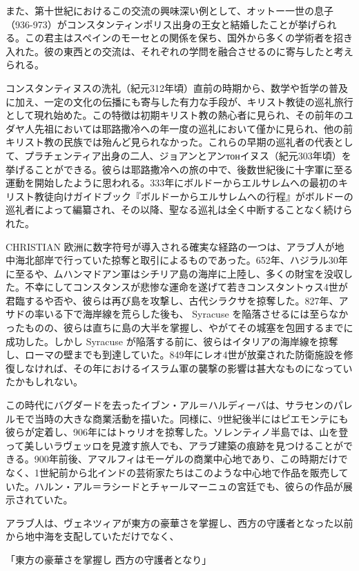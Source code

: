 \documentclass[a4paper,11pt,openany]{ltjsbook}
\begin{document}
また、第十世紀におけるこの交流の興味深い例として、オットー一世の息子（936-973）がコンスタンティンポリス出身の王女と結婚したことが挙げられる。この君主はスペインのモーセとの関係を保ち、国外から多くの学術者を招き入れた。彼の東西との交流は、それぞれの学問を融合させるのに寄与したと考えられる。

コンスタンティヌスの洗礼（紀元312年頃）直前の時期から、数学や哲学の普及に加え、一定の文化の伝播にも寄与した有力な手段が、キリスト教徒の巡礼旅行として現れ始めた。この特徴は初期キリスト教の熱心者に見られ、その前年のユダヤ人先祖においては耶路撒冷への年一度の巡礼において僅かに見られ、他の前キリスト教の民族では殆んど見られなかった。これらの早期の巡礼者の代表として、プラチェンティア出身の二人、ジョアンとアンтонイヌス（紀元303年頃）を挙げることができる。彼らは耶路撒冷への旅の中で、後数世紀後に十字軍に至る運動を開始したように思われる。333年にボルドーからエルサレムへの最初のキリスト教徒向けガイドブック『ボルドーからエルサレムへの行程』がボルドーの巡礼者によって編纂され、その以降、聖なる巡礼は全く中断することなく続けられた。

CHRISTIAN 欧洲に数字符号が導入される確実な経路の一つは、アラブ人が地中海北部岸で行っていた掠奪と取引によるものであった。652年、ハジラル30年に至るや、ムハンマドアン軍はシチリア島の海岸に上陸し、多くの財宝を没収した。不幸にしてコンスタンスが悲惨な運命を遂げて若きコンスタントゥス4世が君臨するや否や、彼らは再び島を攻撃し、古代シラクサを掠奪した。827年、アサドの率いる下で海岸線を荒らした後も、 Syracuse を陥落させるには至らなかったものの、彼らは直ちに島の大半を掌握し、やがてその城塞を包囲するまでに成功した。しかし Syracuse が陥落する前に、彼らはイタリアの海岸線を掠奪し、ローマの壁までも到達していた。849年にレオ4世が放棄された防衛施設を修復しなければ、その年におけるイスラム軍の襲撃の影響は甚大なものになっていたかもしれない。

この時代にバグダードを去ったイブン・アル＝ハルディーバは、サラセンのパレルモで当時の大きな商業活動を描いた。同様に、9世紀後半にはピエモンテにも彼らが定着し、906年にはトゥリオを掠奪した。ソレンティノ半島では、山を登って美しいラヴェッロを見渡す旅人でも、アラブ建築の痕跡を見つけることができる。900年前後、アマルフィはモーゲルの商業中心地であり、この時期だけでなく、1世紀前から北インドの芸術家たちはこのような中心地で作品を販売していた。ハルン・アル＝ラシードとチャールマーニュの宮廷でも、彼らの作品が展示されていた。

アラブ人は、ヴェネツィアが東方の豪華さを掌握し、西方の守護者となった以前から地中海を支配していただけでなく、

「東方の豪華さを掌握し
 西方の守護者となり」
\end{document}
